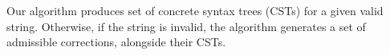 \documentclass[sigplan,review,anonymous,acmsmall]{acmart}\settopmatter{printfolios=false,printccs=false,printacmref=false}
\begin{document}
%

\newcommand\ddd{\Ddots}
\newcommand\vdd{\Vdots}
\newcommand\cdd{\Cdots}
\newcommand\lds{\ldots}
\newcommand\vno{\varnothing}
\newcommand{\ts}[1]{\textsuperscript{#1}}
\newcommand\non{1\ts{st}}
\newcommand\ntw{2\ts{nd}}
\newcommand\nth{3\ts{rd}}
\newcommand\nfo{4\ts{th}}
\newcommand\nfi{5\ts{th}}
\newcommand\nsi{6\ts{th}}
\newcommand\nse{7\ts{th}}
\newcommand{\vs}[1]{\sigma_{#1}^{\shur}}
\newcommand{\gs}[1]{\gamma_{#1}^{\shur}}
\newcommand{\bs}[1]{\beta_{#1}^{\shur}}
\newcommand{\qs}[1]{\alpha_{#1}^{\shur}}
\newcommand\rcr{\rowcolor{black!15}}
\newcommand\rcw{\rowcolor{white}}
\newcommand\pcd{\cdot}
\newcommand\pcp{\phantom\cdot}
\newcommand\ppp{\phantom{\nse}}
\newcommand\hhg[1]{\tikz[overlay]\node[rectangle,fill=black!15,draw=none,text opacity =1] {$#1$};}

Our algorithm produces set of concrete syntax trees (CSTs) for a given valid string. Otherwise, if the string is invalid, the algorithm generates a set of admissible corrections, alongside their CSTs.
\end{document}
